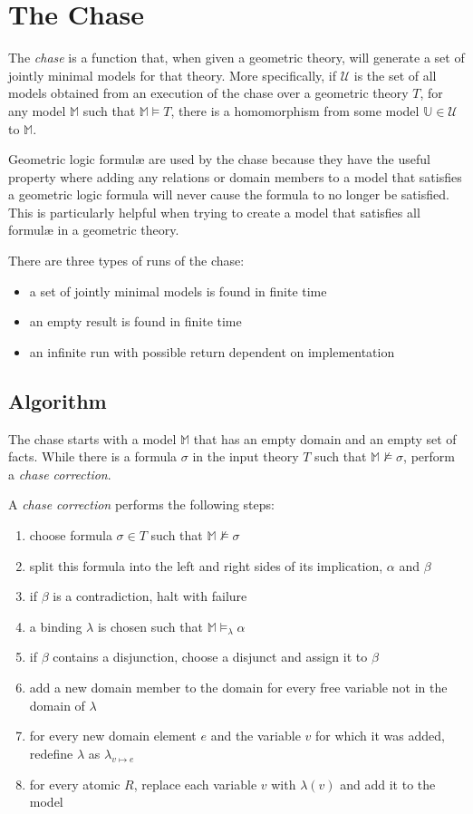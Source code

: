\section{The Chase}

	The \emph{chase} is a function that, when given a geometric theory, will
	generate a set of jointly minimal models for that theory. More
	specifically, if $\mathcal{U}$ is the set of all models obtained from an
	execution of the chase over a geometric theory $T$, for any model
	$\mathbb{M}$ such that $\mathbb{M} \models T$, there is a homomorphism from
	some model $\mathbb{U} \in \mathcal{U}$ to $\mathbb{M}$.

	Geometric logic formul{\ae} are used by the chase because they have the
	useful property where adding any relations or domain members to a model
	that satisfies a geometric logic formula will never cause the formula to no
	longer be satisfied. This is particularly helpful when trying to create a
	model that satisfies all formul{\ae} in a geometric theory.

	There are three types of runs of the chase:
	\begin{itemize}
	\item a set of jointly minimal models is found in finite time
	\item an empty result is found in finite time
	\item an infinite run with possible return dependent on implementation
	\end{itemize}

	\subsection{Algorithm}

		The chase starts with a model $\mathbb{M}$ that has an empty domain and
		an empty set of facts. While there is a formula $\sigma$ in the input
		theory $T$ such that $\mathbb{M} \not\models \sigma$, perform a
		\emph{chase correction}.

		A \emph{chase correction} performs the following steps:
		\begin{enumerate}
		\item choose formula $\sigma \in T$ such that $\mathbb{M} \not\models \sigma$
		\item split this formula into the left and right sides of its implication, $\alpha$ and $\beta$
		\item if $\beta$ is a contradiction, halt with failure
		\item a binding $\lambda$ is chosen such that $\mathbb{M} \models_\lambda \alpha$
		\item if $\beta$ contains a disjunction, choose a disjunct and assign it to $\beta$
		\item add a new domain member to the domain for every free variable not in the domain of $\lambda$
		\item for every new domain element $e$ and the variable $v$ for which it was added, redefine $\lambda$ as $\lambda_{v \mapsto e}$
		\item for every atomic $R$, replace each variable $v$ with $\lambda(v)$ and add it to the model
		\end{enumerate}

